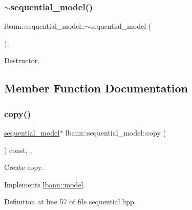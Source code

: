 \subsubsection{\texorpdfstring{$\sim$sequential\+\_\+model()}{~sequential\_model()}}
{\footnotesize\ttfamily lbann\+::sequential\+\_\+model\+::$\sim$sequential\+\_\+model (\begin{DoxyParamCaption}{ }\end{DoxyParamCaption})\hspace{0.3cm}{\ttfamily [override]}, {\ttfamily [default]}}

Destructor. 

\subsection{Member Function Documentation}
\mbox{\label{classlbann_1_1sequential__model_a548d44a9c4c6bec3680d60b20ac9bd73}} 
\subsubsection{\texorpdfstring{copy()}{copy()}}
{\footnotesize\ttfamily \hyperlink{classlbann_1_1sequential__model}{sequential\+\_\+model}$\ast$ lbann\+::sequential\+\_\+model\+::copy (\begin{DoxyParamCaption}{ }\end{DoxyParamCaption}) const\hspace{0.3cm}{\ttfamily [inline]}, {\ttfamily [override]}, {\ttfamily [virtual]}}

Create copy. 

Implements \hyperlink{classlbann_1_1model_aacd024c11f0897b33a7e7838b9433ba2}{lbann\+::model}.



Definition at line 57 of file sequential.\+hpp.


